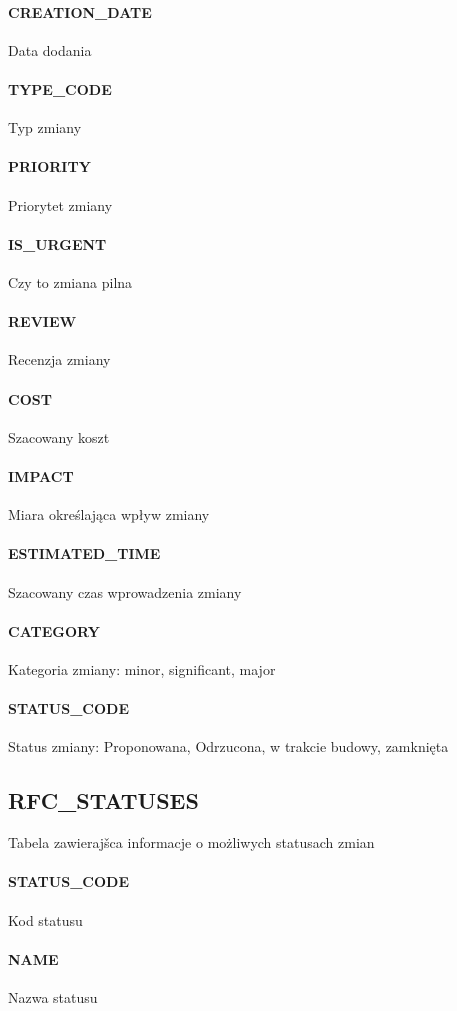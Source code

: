 \documentclass[a4paper, oneside, 11pt]{report}
\begin{document}
\paragraph{CREATION\_DATE} Data dodania
\paragraph{TYPE\_CODE} Typ zmiany
\paragraph{PRIORITY} Priorytet zmiany
\paragraph{IS\_URGENT} Czy to zmiana pilna
\paragraph{REVIEW} Recenzja zmiany
\paragraph{COST} Szacowany koszt
\paragraph{IMPACT} Miara określająca wpływ zmiany
\paragraph{ESTIMATED\_TIME} Szacowany czas wprowadzenia zmiany
\paragraph{CATEGORY} Kategoria zmiany: minor, significant, major
\paragraph{STATUS\_CODE} Status zmiany: Proponowana, Odrzucona, w trakcie budowy, zamknięta


\subsection{RFC\_STATUSES}  Tabela zawierajšca informacje o możliwych statusach zmian
\paragraph{STATUS\_CODE} Kod statusu
\paragraph{NAME} Nazwa statusu
\end{document}
